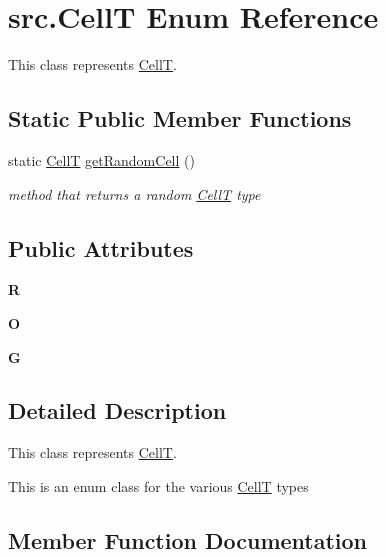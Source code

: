 \hypertarget{enumsrc_1_1CellT}{}\section{src.\+CellT Enum Reference}
\label{enumsrc_1_1CellT}


This class represents \hyperlink{enumsrc_1_1CellT}{CellT}.  


\subsection*{Static Public Member Functions}
\begin{DoxyCompactItemize}
\item 
static \hyperlink{enumsrc_1_1CellT}{CellT} \hyperlink{enumsrc_1_1CellT_a0530fdac090dca9ed1583cb4f1ed2160}{get\+Random\+Cell} ()
\begin{DoxyCompactList}\small\item\em method that returns a random \hyperlink{enumsrc_1_1CellT}{CellT} type \end{DoxyCompactList}\end{DoxyCompactItemize}
\subsection*{Public Attributes}
\begin{DoxyCompactItemize}
\item 
\mbox{\label{enumsrc_1_1CellT_aee2fb51c1d4dc2ec113095e00bffb237}} 
{\bfseries R}
\item 
\mbox{\label{enumsrc_1_1CellT_a892cd49462863de7f5a6f5e55118f403}} 
{\bfseries O}
\item 
\mbox{\label{enumsrc_1_1CellT_a1ca34e928f5497855fc0dbcd31acdb5f}} 
{\bfseries G}
\end{DoxyCompactItemize}


\subsection{Detailed Description}
This class represents \hyperlink{enumsrc_1_1CellT}{CellT}. 

This is an enum class for the various \hyperlink{enumsrc_1_1CellT}{CellT} types 

\subsection{Member Function Documentation}
\mbox{\label{enumsrc_1_1CellT_a0530fdac090dca9ed1583cb4f1ed2160}} 

